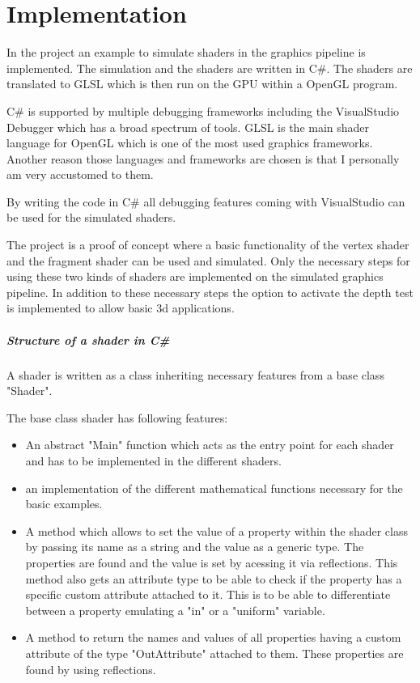 
\chapter{Implementation}\label{cha:Implementation}

In the project  an example to simulate shaders in the graphics pipeline is implemented. The simulation and the shaders are written in C\#. The shaders are translated to GLSL which is then run on the GPU within a OpenGL program.

C\# is supported by multiple debugging frameworks including the  VisualStudio Debugger which has a broad spectrum of tools.  GLSL is the main shader language for OpenGL which is one of the most used graphics frameworks. 
Another reason those languages and frameworks are chosen is that I personally am very accustomed to them.

By writing the code in C\# all debugging features coming with VisualStudio can be used for the simulated shaders.

The project is a proof of concept where a basic functionality of the vertex shader and the fragment shader can be used and simulated. Only the necessary steps for using these two kinds of shaders are implemented on the simulated graphics pipeline. In addition to these necessary steps the option to activate the depth test is implemented to allow basic 3d applications.

\paragraph{Structure of a shader in C\#}

A shader is written as a class inheriting necessary features from a base class "Shader".

The base class shader has following features:
\begin{itemize}
\item An abstract "Main" function which acts as the entry point for each shader and has to be implemented in the different shaders.
\item an implementation of the different mathematical functions necessary for the basic examples.
\item A method which allows to set the value of a property within the shader class by passing its name as a string and the value as a generic type. The properties are found and the value is set by acessing it via reflections. This method also gets an attribute type to be able to check if the property has a specific custom attribute attached to it. This is to be able to differentiate between a property emulating a "in" or a "uniform" variable.
\item A method to return the names and values of all properties having a custom attribute of the type "OutAttribute" attached to them. These properties are found by using reflections.
\end{itemize}

